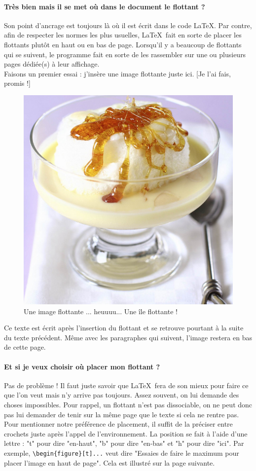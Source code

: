 \documentclass[a4paper, 13pt]{report} %
\begin{document}
		\paragraph{Très bien mais il se met où dans le document le flottant ?\\}
			Son point d'ancrage est toujours là où il est écrit dans le code \LaTeX . Par contre, afin de respecter les normes les plus usuelles, \LaTeX\ fait en sorte de placer les flottants plutôt en haut ou en bas de page. Lorsqu'il y a beaucoup de flottants qui se suivent, le programme fait en sorte de les rassembler sur une ou plusieurs pages dédiée(s) à leur affichage.\\\indent
			Faisons un premier essai : j'insère une image flottante juste ici. [Je l'ai fais, promis !]
			\begin{figure}\centering
				\includegraphics[width=.3\textwidth]{positions/flottante.jpg}
				\caption{Une image flottante ... heuuuu... Une île flottante !}
			\end{figure}
			Ce texte est écrit après l'insertion du flottant et se retrouve pourtant à la suite du texte précédent. Même avec les paragraphes qui suivent, l'image restera en bas de cette page.
		\paragraph{Et si je veux choisir où placer mon flottant ?\\}
			Pas de problème ! Il faut juste savoir que \LaTeX\ fera de son mieux pour faire ce que l'on veut mais n'y arrive pas toujours. Assez souvent, on lui demande des choses impossibles. Pour rappel, un flottant n'est pas dissociable, on ne peut donc pas lui demander de tenir sur la même page que le texte si cela ne rentre pas. Pour mentionner notre préférence de placement, il suffit de la préciser entre crochets juste après l'appel de l'environnement. La position se fait à l'aide d'une lettre : "t" pour dire "en-haut", "b" pour dire "en-bas" et "h" pour dire "ici". Par exemple, \verb|\begin{figure}[t]...| veut dire "Essaies de faire le maximum pour placer l'image en haut de page". Cela est illustré sur la page suivante.
\end{document}
